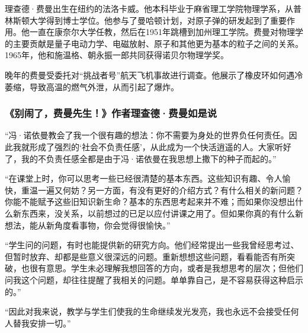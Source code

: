 理查德·费曼出生在纽约的法洛卡威。他本科毕业于麻省理工学院物理学系，从普林斯顿大学得到博士学位。他参与了曼哈顿计划，对原子弹的研发起到了重要作用。他一直在康奈尔大学任教，然后在1951年跳槽到加州理工学院。费曼对物理学的主要贡献是量子电动力学、电磁放射、原子和其他更为基本的粒子之间的关系。1965年，他和施温格、朝永振一郎共同获得诺贝尔物理学奖。
\par

晚年的费曼受委托对“挑战者号”航天飞机事故进行调查。他展示了橡皮环如何遇冷萎缩，导致高温的燃气外泄，从而引起了爆炸。
\par

\subsubsection*{《别闹了，费曼先生！》作者理查德·费曼如是说}

“冯·诺依曼教会了我一个很有趣的想法：你不需要为身处的世界负任何责任。因此我就形成了强烈的‘社会不负责任感’，从此成为一个快活逍遥的人。大家听好了，我的不负责任感全都是由于冯·诺依曼在我思想上撒下的种子而起的。”
\par

“在课堂上时，你可以思考一些已经很清楚的基本东西。这些知识有趣、令人愉快，重温一遍又何妨？另一方面，有没有更好的介绍方式？有什么相关的新问题？你能不能赋予这些旧知识新生命？基本的东西思考起来并不难；而如果你没想出什么新东西来，没关系，以前想过的已足以应付讲课之用了。但如果你真的有什么新想法，能从新角度看事物，你会觉得很愉快。”
\par

“学生问的问题，有时也能提供新的研究方向。他们经常提出一些我曾经思考过、但暂时放弃、却都是些意义很深远的问题。重新想想这些问题，看看能否有所突破，也很有意思。学生未必理解我想回答的方向，或者是我想思考的层次；但他们问我这个问题，却往往提醒了我相关的问题。单单靠自己，是不容易获得这种启示的。”
\par

“因此对我来说，教学与学生们使我的生命继续发光发亮，我也永远不会接受任何人替我安排一切。”
\par
